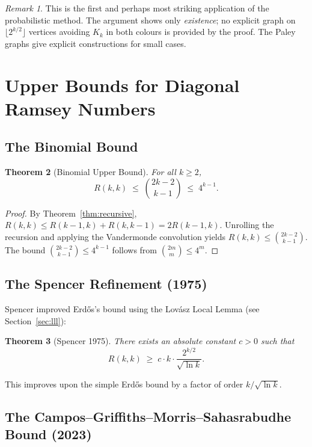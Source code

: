 \documentclass[12pt,a4paper]{amsart}
\newtheorem{theorem}{Theorem}[section]
\theoremstyle{definition}
\theoremstyle{remark}
\newtheorem{remark}[theorem]{Remark}
\begin{document}
\begin{remark}
This is the first and perhaps most striking application of the probabilistic method.
The argument shows only \emph{existence}; no explicit graph on $\lfloor 2^{k/2}\rfloor$
vertices avoiding $K_k$ in both colours is provided by the proof.  The Paley
graphs give explicit constructions for small cases.
\end{remark}

\section{Upper Bounds for Diagonal Ramsey Numbers}

\subsection{The Binomial Bound}

\begin{theorem}[Binomial Upper Bound]\label{thm:binomial-upper}
For all $k \ge 2$,
\[
  R(k,k) \;\le\; \binom{2k-2}{k-1} \;\le\; 4^{k-1}.
\]
\end{theorem}

\begin{proof}
By Theorem~\ref{thm:recursive}, $R(k,k) \le R(k-1,k) + R(k,k-1) = 2R(k-1,k)$.
Unrolling the recursion and applying the Vandermonde convolution yields
$R(k,k) \le \binom{2k-2}{k-1}$.  The bound $\binom{2k-2}{k-1} \le 4^{k-1}$
follows from $\binom{2m}{m} \le 4^m$.
\end{proof}

\subsection{The Spencer Refinement (1975)}

Spencer \cite{Spencer1975} improved Erd\H{o}s's bound using the Lov\'asz Local
Lemma (see Section~\ref{sec:lll}):

\begin{theorem}[Spencer 1975]\label{thm:spencer}
There exists an absolute constant $c > 0$ such that
\[
  R(k,k) \;\ge\; c \cdot k \cdot \frac{2^{k/2}}{\sqrt{\ln k}}.
\]
\end{theorem}

This improves upon the simple Erd\H{o}s bound by a factor of order
$k/\sqrt{\ln k}$.

\subsection{The Campos--Griffiths--Morris--Sahasrabudhe Bound (2023)}
\end{document}
